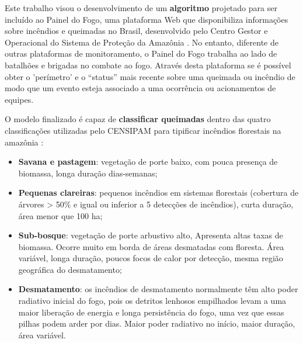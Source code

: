 Este trabalho visou o desenvolvimento de um \textbf{algoritmo} projetado para ser incluído ao Painel do Fogo, uma plataforma Web que disponibiliza informações sobre incêndios e queimadas no Brasil, desenvolvido pelo Centro Gestor e Operacional do Sistema de Proteção da Amazônia \cite{painel-fogo}. No entanto, diferente de outras plataformas de monitoramento, o Painel do Fogo trabalha ao lado de batalhões e brigadas no combate ao fogo. Através desta plataforma se é possível obter o 'perímetro' e o “status” mais recente sobre uma queimada ou incêndio de modo que um evento esteja associado a uma ocorrência ou acionamentos de equipes.

O modelo finalizado é capaz de \textbf{classificar queimadas} dentro das quatro classificações utilizadas pelo CENSIPAM para tipificar incêndios florestais na amazônia \cite{andela}: 


\begin{itemize}
    \item  \textbf{Savana e pastagem}: vegetação de porte baixo, com pouca presença de biomassa, longa duração dias-semanas;
    \item \textbf{Pequenas clareiras}: pequenos incêndios em sistemas florestais (cobertura de árvores > 50$\%$ e igual ou inferior a 5 detecções de incêndios), curta duração, área menor que 100 ha;
    \item \textbf{Sub-bosque}: vegetação de porte arbustivo alto, Apresenta altas taxas de biomassa. Ocorre muito em borda de áreas desmatadas com floresta. Área variável, longa duração, poucos focos de calor por detecção, mesma região geográfica do desmatamento;
    \item \textbf{Desmatamento}: os incêndios de desmatamento normalmente têm alto poder radiativo inicial do fogo, pois os detritos lenhosos empilhados levam a uma maior liberação de energia e longa persistência do fogo, uma vez que essas pilhas podem arder por dias. Maior poder radiativo no início, maior duração, área variável.

\end{itemize} 

